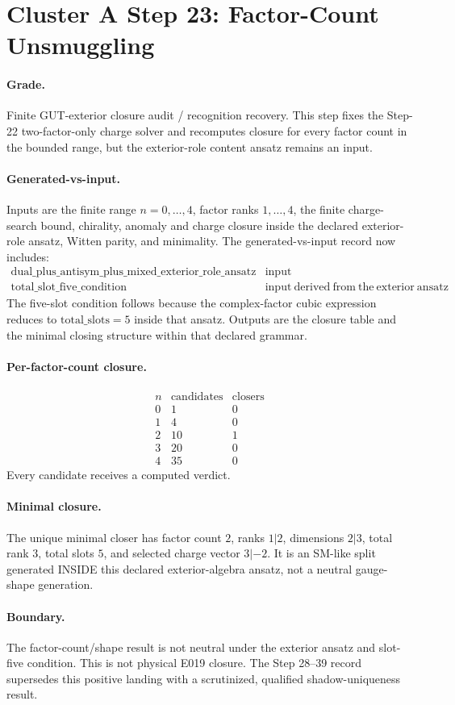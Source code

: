 \section*{Cluster A Step 23: Factor-Count Unsmuggling}

\paragraph{Grade.}
Finite GUT-exterior closure audit / recognition recovery. This step fixes the Step-22 two-factor-only charge solver and recomputes closure for every factor count in the bounded range, but the exterior-role content ansatz remains an input.

\paragraph{Generated-vs-input.}
Inputs are the finite range \(n=0,\ldots,4\), factor ranks \(1,\ldots,4\), the finite charge-search bound, chirality, anomaly and charge closure inside the declared exterior-role ansatz, Witten parity, and minimality. The generated-vs-input record now includes:
\[
\begin{array}{l|l}
\mathrm{dual\_plus\_antisym\_plus\_mixed\_exterior\_role\_ansatz} & \mathrm{input}\\
\mathrm{total\_slot\_five\_condition} & \mathrm{input\ derived\ from\ the\ exterior\ ansatz}
\end{array}
\]
The five-slot condition follows because the complex-factor cubic expression reduces to \( \mathrm{total\_slots}=5 \) inside that ansatz. Outputs are the closure table and the minimal closing structure within that declared grammar.

\paragraph{Per-factor-count closure.}
\[
\begin{array}{c|cc}
n & \mathrm{candidates} & \mathrm{closers}\\
\hline
0 & 1 & 0\\
1 & 4 & 0\\
2 & 10 & 1\\
3 & 20 & 0\\
4 & 35 & 0
\end{array}
\]
Every candidate receives a computed verdict.

\paragraph{Minimal closure.}
The unique minimal closer has factor count \(2\), ranks \(1|2\), dimensions \(2|3\), total rank \(3\), total slots \(5\), and selected charge vector \(3|-2\). It is an SM-like split generated INSIDE this declared exterior-algebra ansatz, not a neutral gauge-shape generation.

\paragraph{Boundary.}
The factor-count/shape result is not neutral under the exterior ansatz and slot-five condition. This is not physical E019 closure. The Step 28--39 record supersedes this positive landing with a scrutinized, qualified shadow-uniqueness result.
